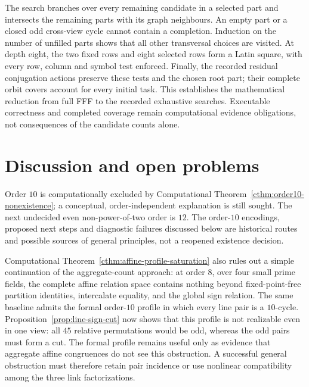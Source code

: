 The search branches over every remaining candidate in a selected part and
intersects the remaining parts with its graph neighbours.  An empty part
or a closed odd cross-view cycle cannot contain a completion.  Induction on
the number of unfilled parts shows that all other transversal choices are
visited.  At depth eight, the two fixed rows and eight selected rows form
a Latin square, with every row, column and symbol test enforced.  Finally,
the recorded residual conjugation actions preserve these tests and the
chosen root part; their complete orbit covers account for every initial
task.  This establishes the mathematical reduction from full FFF to the
recorded exhaustive searches.  Executable correctness and completed coverage
remain computational evidence obligations, not consequences of the
candidate counts alone.

\section{Discussion and open problems}

Order $10$ is computationally excluded by
Computational Theorem~\ref{cthm:order10-nonexistence}; a conceptual,
order-independent explanation is still sought.  The next undecided even
non-power-of-two order is $12$.  The order-$10$ encodings, proposed next
steps and diagnostic failures discussed below are historical routes and
possible sources of general principles, not a reopened existence decision.

Computational Theorem~\ref{cthm:affine-profile-saturation} also rules out a
simple continuation of the aggregate-count approach: at order $8$, over four
small prime fields, the complete affine relation space contains nothing
beyond fixed-point-free partition identities, intercalate equality, and the
global sign relation.  The same baseline admits the formal order-$10$
profile in which every line pair is a $10$-cycle.
Proposition~\ref{prop:line-sign-cut} now shows that this profile is not
realizable even in one view: all $45$ relative permutations would be odd,
whereas the odd pairs must form a cut.  The formal profile remains useful
only as evidence that aggregate affine congruences do not see this
obstruction.  A successful general obstruction must therefore retain pair
incidence or use nonlinear compatibility among the three link
factorizations.

